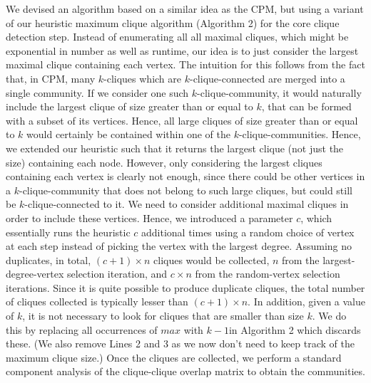 We devised an algorithm based on a similar idea as the CPM, but using a variant of our heuristic maximum clique algorithm (Algorithm 2) for the core  clique detection step. 
Instead of enumerating all all maximal cliques, which might be exponential in number as well as runtime, our idea is to just consider the largest maximal clique containing each vertex. The intuition for this follows from the fact that, in  CPM, many $k$-cliques which are $k$-clique-connected are merged into a single community. If we consider one such $k$-clique-community, it would naturally include the largest clique of size greater than or equal to $k$, that can be formed with a subset of its vertices. Hence, all large cliques of size greater than or equal to $k$ would certainly be contained within one of the $k$-clique-communities. Hence, we extended our heuristic such that it returns the largest clique (not just the size) containing each node. However, only considering the largest cliques containing each vertex is clearly not enough, since there could be other vertices in a $k$-clique-community that does not belong to such large cliques, but could still be $k$-clique-connected to it. We need to consider additional maximal cliques in order to include these vertices. Hence, we introduced a parameter $c$, which essentially runs the heuristic $c$ additional times using a random choice of vertex at each step instead of picking the vertex with the largest degree. Assuming no duplicates, in total, $(c+1) \times n$ cliques would be collected, $n$ from the largest-degree-vertex selection iteration, and $c \times n$ from the random-vertex selection iterations. Since it is quite possible to produce duplicate cliques, the total number of cliques collected is typically lesser than $(c+1) \times n$.
In addition, given a value of $k$, it is not necessary to look for cliques that are smaller than size $k$. We do this by replacing all occurrences of $max$ with $k-1$in Algorithm 2 which discards these. (We also remove Lines 2 and 3 as we now don't need to keep track of the maximum clique size.) Once the cliques are collected, we perform a standard component analysis of the clique-clique overlap matrix to obtain the communities.





